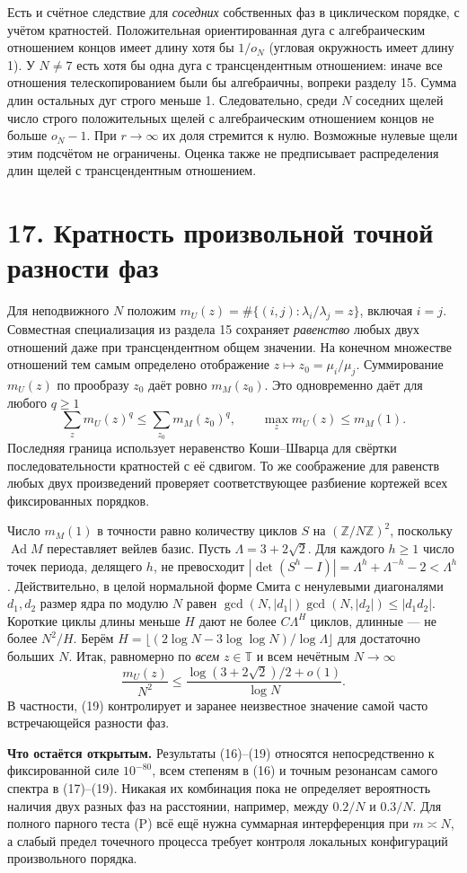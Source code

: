 \documentclass[11pt,a4paper]{article}
\newcommand{\Z}{\mathbb Z}
\newcommand{\sect}[1]{\section*{\sffamily\color{ink}#1}}
\newcommand{\subt}[1]{\par\medskip\noindent\textbf{#1.}\quad}
\begin{document}
Есть и счётное следствие для \emph{соседних} собственных фаз в циклическом порядке, с учётом кратностей. Положительная ориентированная дуга с алгебраическим отношением концов имеет длину хотя бы $1/o_N$ (угловая окружность имеет длину 1). У $N\ne7$ есть хотя бы одна дуга с трансцендентным отношением: иначе все отношения телескопированием были бы алгебраичны, вопреки разделу 15. Сумма длин остальных дуг строго меньше 1. Следовательно, среди $N$ соседних щелей число строго положительных щелей с алгебраическим отношением концов не больше $o_N-1$. При $r\to\infty$ их доля стремится к нулю. Возможные нулевые щели этим подсчётом не ограничены. Оценка также не предписывает распределения длин щелей с трансцендентным отношением.
\newpage
\sect{17. Кратность произвольной точной разности фаз}
Для неподвижного $N$ положим $m_U(z)=\#\{(i,j):\lambda_i/\lambda_j=z\}$, включая $i=j$. Совместная специализация из раздела 15 сохраняет \emph{равенство} любых двух отношений даже при трансцендентном общем значении. На конечном множестве отношений тем самым определено отображение $z\mapsto z_0=\mu_i/\mu_j$. Суммирование $m_U(z)$ по прообразу $z_0$ даёт ровно $m_M(z_0)$. Это одновременно даёт для любого $q\ge1$
\[
 \sum_z m_U(z)^q\le\sum_{z_0}m_M(z_0)^q,\qquad
 \max_z m_U(z)\le m_M(1).
\]
Последняя граница использует неравенство Коши--Шварца для свёртки последовательности кратностей с её сдвигом. То же соображение для равенств любых двух произведений проверяет соответствующее разбиение кортежей всех фиксированных порядков.

Число $m_M(1)$ в точности равно количеству циклов $S$ на $(\Z/N\Z)^2$, поскольку $\operatorname{Ad}M$ переставляет вейлев базис. Пусть $\Lambda=3+2\sqrt2$. Для каждого $h\ge1$ число точек периода, делящего $h$, не превосходит $|\det(S^h-I)|=\Lambda^h+\Lambda^{-h}-2<\Lambda^h$. Действительно, в целой нормальной форме Смита с ненулевыми диагоналями $d_1,d_2$ размер ядра по модулю $N$ равен $\gcd(N,|d_1|)\gcd(N,|d_2|)\le|d_1d_2|$. Короткие циклы длины меньше $H$ дают не более $C\Lambda^H$ циклов, длинные --- не более $N^2/H$. Берём $H=\lfloor (2\log N-3\log\log N)/\log\Lambda\rfloor$ для достаточно больших $N$. Итак, равномерно по \emph{всем} $z\in\mathbb T$ и всем нечётным $N\to\infty$
\[
 \frac{m_U(z)}{N^2}
 \le\frac{\log(3+2\sqrt2)/2+o(1)}{\log N}.                              \tag{19}
\]
В частности, (19) контролирует и заранее неизвестное значение самой часто встречающейся разности фаз.

\subt{Что остаётся открытым} Результаты (16)--(19) относятся непосредственно к фиксированной силе $10^{-80}$, всем степеням в (16) и точным резонансам самого спектра в (17)--(19). Никакая их комбинация пока не определяет вероятность наличия двух разных фаз на расстоянии, например, между $0.2/N$ и $0.3/N$. Для полного парного теста (P) всё ещё нужна суммарная интерференция при $m\asymp N$, а слабый предел точечного процесса требует контроля локальных конфигураций произвольного порядка.
\end{document}
